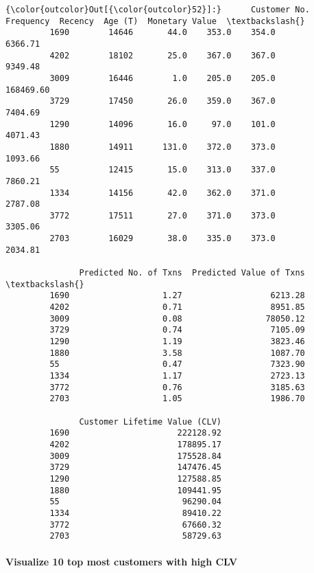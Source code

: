 \documentclass[11pt]{article}
\begin{document}
\begin{Verbatim}[commandchars=\\\{\}]
{\color{outcolor}Out[{\color{outcolor}52}]:}      Customer No.  Frequency  Recency  Age (T)  Monetary Value  \textbackslash{}
         1690        14646       44.0    353.0    354.0         6366.71   
         4202        18102       25.0    367.0    367.0         9349.48   
         3009        16446        1.0    205.0    205.0       168469.60   
         3729        17450       26.0    359.0    367.0         7404.69   
         1290        14096       16.0     97.0    101.0         4071.43   
         1880        14911      131.0    372.0    373.0         1093.66   
         55          12415       15.0    313.0    337.0         7860.21   
         1334        14156       42.0    362.0    371.0         2787.08   
         3772        17511       27.0    371.0    373.0         3305.06   
         2703        16029       38.0    335.0    373.0         2034.81   
         
               Predicted No. of Txns  Predicted Value of Txns  \textbackslash{}
         1690                   1.27                  6213.28   
         4202                   0.71                  8951.85   
         3009                   0.08                 78050.12   
         3729                   0.74                  7105.09   
         1290                   1.19                  3823.46   
         1880                   3.58                  1087.70   
         55                     0.47                  7323.90   
         1334                   1.17                  2723.13   
         3772                   0.76                  3185.63   
         2703                   1.05                  1986.70   
         
               Customer Lifetime Value (CLV)  
         1690                      222128.92  
         4202                      178895.17  
         3009                      175528.84  
         3729                      147476.45  
         1290                      127588.85  
         1880                      109441.95  
         55                         96290.04  
         1334                       89410.22  
         3772                       67660.32  
         2703                       58729.63  
\end{Verbatim}
            
    \paragraph{Visualize 10 top most customers with high
CLV}\label{visualize-10-top-most-customers-with-high-clv}
\end{document}
